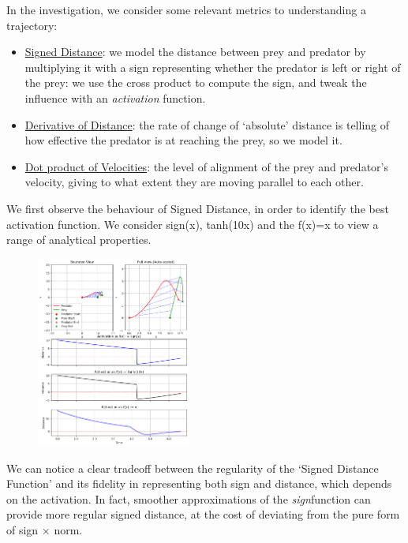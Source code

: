 \documentclass[10pt, twocolumn]{article}
\begin{document}
        In the investigation, we consider some relevant metrics to understanding a trajectory:
        \begin{itemize}
          \item \underline{Signed Distance}: we model the distance between prey and predator by multiplying it with a sign representing whether the predator is left or right of the prey: we use the cross product to compute the sign, and tweak the influence with an \textit{activation} function.
          \item \underline{Derivative of Distance}: the rate of change of `absolute' distance is telling of how effective the predator is at reaching the prey, so we model it.
          \item \underline{Dot product of Velocities}: the level of alignment of the prey and predator's velocity, giving to what extent they are moving parallel to each other.
        \end{itemize}

        We first observe the behaviour of Signed Distance, in order to identify the best activation function. We consider sign(x), tanh(10x) and the f(x)=x to view a range of analytical properties.
        \begin{figure}[H]
          \centering
          \includegraphics[width=0.45\textwidth]{figures/signed_distance.png}
          \label{fig:trajectory}
        \end{figure}

        We can notice a clear tradeoff between the regularity of the `Signed Distance Function' and its fidelity in representing both sign and distance, which depends on the activation. In fact, smoother approximations of the \textit{sign}function can provide more regular signed distance, at the cost of deviating from the pure form of sign $\times$ norm.
\end{document}
